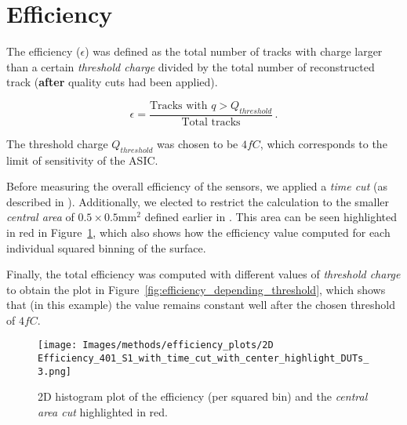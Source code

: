 

\section{Efficiency}\label{sec:methods_efficiency}

The efficiency (\(\epsilon\)) was defined as the total number of tracks with charge larger than a certain \textit{threshold charge} divided by the total number of reconstructed track (\textbf{after} quality cuts had been applied).


\begin{equation*}
    \epsilon = \frac{\text{Tracks with } q>Q_{threshold}}{\text{Total tracks}}  \, .
\end{equation*}

The threshold charge \(Q_{threshold}\) was chosen to be \(4\si{fC}\), which corresponds to the limit of sensitivity of the ASIC.

Before measuring the overall efficiency of the sensors, we applied a \textit{time cut} (as described in ). Additionally, we elected to restrict the calculation to the smaller \textit{central area} of \(0.5\times0.5\unit{\milli\meter^2}\) defined earlier in . This area can be seen highlighted in red in Figure~\ref{fig:efficiency_2D_plot}, which also shows how the efficiency value computed for each individual squared binning of the surface.

Finally, the total efficiency was computed with different values of \textit{threshold charge} to obtain the plot in Figure~\ref{fig:efficiency_depending_threshold}, which shows that (in this example) the value remains constant well after the chosen threshold of \(4\si{fC}\).

\begin{figure}[h!tbp]
    \centering
    \texttt{[image: Images/methods/efficiency\_plots/2D Efficiency\_401\_S1\_with\_time\_cut\_with\_center\_highlight\_DUTs\_3.png]}
    \captionsetup{width=\captionwidth}
    \caption{2D histogram plot of the efficiency (per squared bin) and the \textit{central area cut} highlighted in red.}
    \label{fig:efficiency_2D_plot}
\end{figure}

